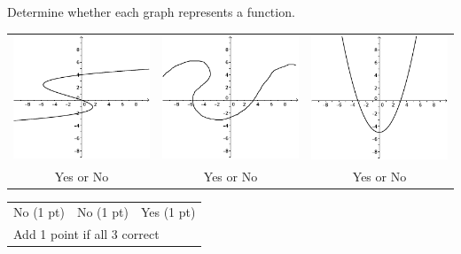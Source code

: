 {
	Determine whether each graph represents a function.
	\begin{center}
	\begin{tabular}{ccc}
	\includegraphics[scale=1]{fig100-22-b-i.pdf} & \includegraphics[scale=1]{fig100-22-b-ii.pdf} & \includegraphics[scale=1]{fig100-22-b-iii.pdf}\\
	Yes or No & Yes or No & Yes or No
	\end{tabular}
	\end{center}
}
{
	\begin{tabular}{lll}
	No (1 pt) & No (1 pt) & Yes (1 pt)\\
	\multicolumn{3}{l}{Add 1 point if all 3 correct}
	\end{tabular}
}

